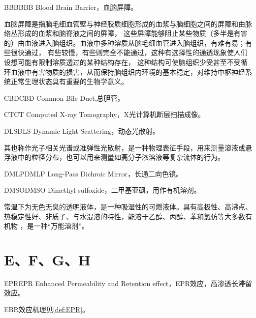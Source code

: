 \documentclass[cn,11pt,chinese]{elegantbook}
\begin{document}
\begin{theorem}{BBB}{BBB} 
Blood Brain Barrier，血脑屏障。

血脑屏障是指脑毛细血管壁与神经胶质细胞形成的血浆与脑细胞之间的屏障和由脉络丛形成的血浆和脑脊液之间的屏障，
这些屏障能够阻止某些物质（多半是有害的）由血液进入脑组织。血液中多种溶质从脑毛细血管进入脑组织，有难有易；有些很快通过，
有些较慢，有些则完全不能通过，这种有选择性的通透现象使人们设想可能有限制溶质透过的某种结构存在，
这种结构可使脑组织少受甚至不受循环血液中有害物质的损害，从而保持脑组织内环境的基本稳定，对维持中枢神经系统正常生理状态具有重要的生物学意义。
\end{theorem}

\begin{theorem}{CBD}{CBD}
Common Bile Duct,总胆管。
\end{theorem}

\begin{theorem}{CT}{CT}
 Computed X-ray Tomography，X光计算机断层扫描成像。
  \end{theorem}


\begin{theorem}{DLS}{DLS}
Dynamic Light Scattering，动态光散射。

其也称作光子相关光谱或准弹性光散射，是一种物理表征手段，用来测量溶液或悬浮液中的粒径分布，也可以用来测量如高分子浓溶液等复杂流体的行为。
\end{theorem}

\begin{theorem}{DMLP}{DMLP}
 	Long-Pass Dichroic Mirror，长通二向色镜。
  \end{theorem}

\begin{theorem}{DMSO}{DMSO}
  Dimethyl sulfoxide，二甲基亚砜，用作有机溶剂。

  常温下为无色无臭的透明液体，是一种吸湿性的可燃液体。具有高极性、高沸点、热稳定性好、非质子、与水混溶的特性，能溶于乙醇、丙醇、苯和氯仿等大多数有机物
  ，是一种“万能溶剂”。
  \end{theorem}
\section{E、F、G、H}
\begin{theorem}{EPR}{EPR} 
  Enhanced Permeability and Retention effect，EPR效应，高渗透长滞留效应。

 \end{theorem}
 \begin{note}
   EBR效应机理见\vref{def:EPR}。
 \end{note}
\end{document}

